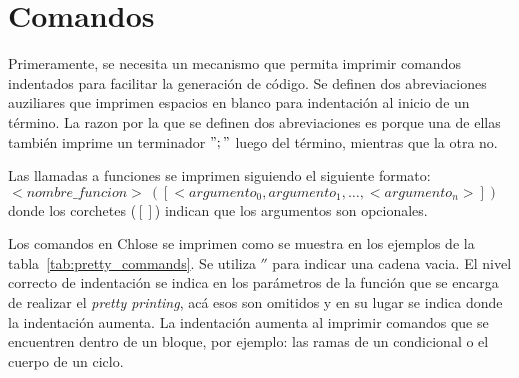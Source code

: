 \section{Comandos}

Primeramente, se necesita un mecanismo que permita imprimir comandos indentados para facilitar la generación de código.
Se definen dos abreviaciones auziliares que imprimen espacios en blanco para indentación al inicio de un término.
La razon por la que se definen dos abreviaciones es porque una de ellas también imprime un terminador $";"$ luego del término, mientras que la otra no.

Las llamadas a funciones se imprimen siguiendo el siguiente formato: $<nombre\_funcion>\ ([<argumento_0, argumento_1, \dots, <argumento_n>])$ donde los corchetes ($[]$) indican que los argumentos son opcionales.

Los comandos en Chlose se imprimen como se muestra en los ejemplos de la tabla~\ref{tab:pretty_commands}.
Se utiliza $''$ para indicar una cadena vacia.
El nivel correcto de indentación se indica en los parámetros de la función que se encarga de realizar el \textit{pretty printing}, acá esos son omitidos y en su lugar se indica donde la indentación aumenta.
La indentación aumenta al imprimir comandos que se encuentren dentro de un bloque, por ejemplo: las ramas de un condicional o el cuerpo de un ciclo.

